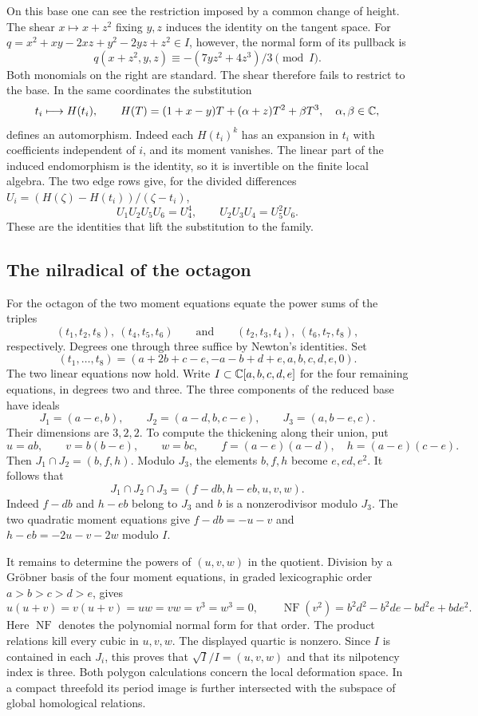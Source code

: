 On this base one can see the restriction imposed by a common change of
height. The shear $x\mapsto x+z^2$ fixing $y,z$ induces the identity on
the tangent space. For $q=x^2+xy-2xz+y^2-2yz+z^2\in I$, however,
the normal form of its pullback is
\[
 q(x+z^2,y,z)\equiv -(7yz^2+4z^3)/3\pmod I.
\]
Both monomials on the right are standard. The shear therefore fails to
restrict to the base. In the same coordinates the substitution
\[
 t_i\longmapsto H(t_i),\qquad
 H(T)=(1+x-y)T+(\alpha+z)T^2+\beta T^3,\quad \alpha,\beta\in\mathbb C,
\]
defines an automorphism. Indeed each $H(t_i)^k$ has an expansion in
$t_i$ with coefficients independent of $i$, and its moment vanishes.
The linear part of the induced endomorphism is the identity, so it is
invertible on the finite local algebra. The two edge rows give, for
the divided differences $U_i=(H(\zeta)-H(t_i))/(\zeta-t_i)$,
\[
 U_1U_2U_5U_6=U_4^4,\qquad U_2U_3U_4=U_5^2U_6.
\]
These are the identities that lift the substitution to the family.

\subsection*{The nilradical of the octagon}
For the octagon of \cite[\S9.3]{Alt} the two moment equations equate
the power sums of the triples
\[
 (t_1,t_2,t_8),\ (t_4,t_5,t_6)\qquad\text{and}\qquad
 (t_2,t_3,t_4),\ (t_6,t_7,t_8),
\]
respectively. Degrees one through three suffice by Newton's identities.
Set
\[
 (t_1,\ldots,t_8)=(a+2b+c-e,-a-b+d+e,a,b,c,d,e,0).
\]
The two linear equations now hold. Write $I\subset\mathbb C[a,b,c,d,e]$
for the four remaining equations, in degrees two and three.
The three components of the reduced base have ideals
\[
 J_1=(a-e,b),\qquad J_2=(a-d,b,c-e),\qquad J_3=(a,b-e,c).
\]
Their dimensions are $3,2,2$. To compute the thickening along their
union, put
\[
 u=ab,\qquad v=b(b-e),\qquad w=bc,\qquad
 f=(a-e)(a-d),\quad h=(a-e)(c-e).
\]
Then $J_1\cap J_2=(b,f,h)$. Modulo $J_3$, the elements $b,f,h$
become $e,ed,e^2$. It follows that
\[
 J_1\cap J_2\cap J_3=(f-db,h-eb,u,v,w).
\]
Indeed $f-db$ and $h-eb$ belong to $J_3$ and $b$ is a
nonzerodivisor modulo $J_3$. The two quadratic moment equations give
$f-db=-u-v$ and $h-eb=-2u-v-2w$ modulo $I$.

It remains to determine the powers of $(u,v,w)$ in the quotient.
Division by a Gr\"obner basis of the four moment equations, in graded
lexicographic order $a>b>c>d>e$, gives
\[
 u(u+v)=v(u+v)=uw=vw=v^3=w^3=0,\qquad
 \operatorname{NF}(v^2)=b^2d^2-b^2de-bd^2e+bde^2.
\]
Here $\operatorname{NF}$ denotes the polynomial normal form for that
order. The product relations kill every cubic in $u,v,w$. The displayed
quartic is nonzero. Since $I$ is contained in each
$J_i$, this proves that $\sqrt I/I=(u,v,w)$ and that its nilpotency
index is three. Both polygon calculations concern the local deformation
space. In a compact threefold its period image is further intersected
with the subspace of global homological relations.
